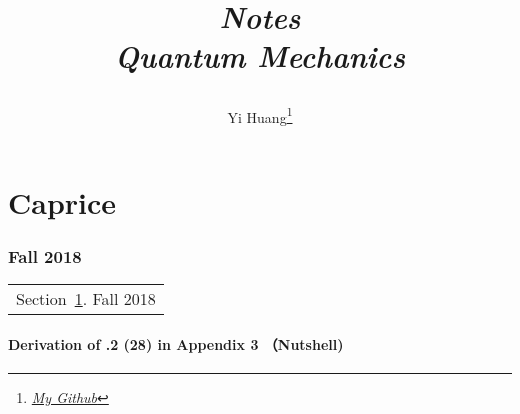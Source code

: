 \documentclass[10pt]{article}
\title{\begin{center}{\Huge \textit{Notes}}\\{{\itshape Quantum Mechanics}}\end{center}}
\author{Yi Huang\footnote{\href{https://github.com/yiihuang}{\textit{My Github}}}}
\affiliation{
University of Minnesota
}
\begin{document}
	\maketitle
	\flushbottom
	\newpage
	\pagestyle{fancynotes}
	\part{Caprice}
	\section{Fall 2018}\label{sec:fall2018}
	\begin{margintable}\vspace{.8in}\footnotesize
		\begin{tabularx}{\marginparwidth}{|X}
		Section~\ref{sec:fall2018}. Fall 2018\\
		\end{tabularx}
	\end{margintable}

\subsection{Derivation of .2 (28) in Appendix 3 （Nutshell)}
\end{document}

